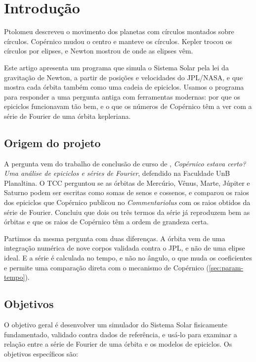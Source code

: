 \section{Introdução}\label{cap:introducao}

Ptolomeu descreveu o movimento dos planetas com círculos montados sobre círculos. Copérnico mudou o centro e manteve os círculos. Kepler trocou os círculos por elipses, e Newton mostrou de onde as elipses vêm.

Este artigo apresenta um programa que simula o Sistema Solar pela lei da gravitação de Newton, a partir de posições e velocidades do JPL/NASA, e que mostra cada órbita também como uma cadeia de epiciclos. Usamos o programa para responder a uma pergunta antiga com ferramentas modernas: por que os epiciclos funcionavam tão bem, e o que os números de Copérnico têm a ver com a série de Fourier de uma órbita kepleriana.

\subsection{Origem do projeto}

A pergunta vem do trabalho de conclusão de curso de , \emph{Copérnico estava certo? Uma análise de epiciclos e séries de Fourier}, defendido na Faculdade UnB Planaltina. O TCC perguntou se as órbitas de Mercúrio, Vênus, Marte, Júpiter e Saturno podem ser escritas como somas de senos e cossenos, e comparou os raios dos epiciclos que Copérnico publicou no \emph{Commentariolus} com os raios obtidos da série de Fourier. Concluiu que dois ou três termos da série já reproduzem bem as órbitas e que os raios de Copérnico têm a ordem de grandeza certa.

Partimos da mesma pergunta com duas diferenças. A órbita vem de uma integração numérica de nove corpos validada contra o JPL, e não de uma elipse ideal. E a série é calculada no tempo, e não no ângulo, o que muda os coeficientes e permite uma comparação direta com o mecanismo de Copérnico (\autoref{sec:param-tempo}).

\subsection{Objetivos}

O objetivo geral é desenvolver um simulador do Sistema Solar fisicamente fundamentado, validado contra dados de referência, e usá-lo para examinar a relação entre a série de Fourier de uma órbita e os modelos de epiciclos. Os objetivos específicos são:

